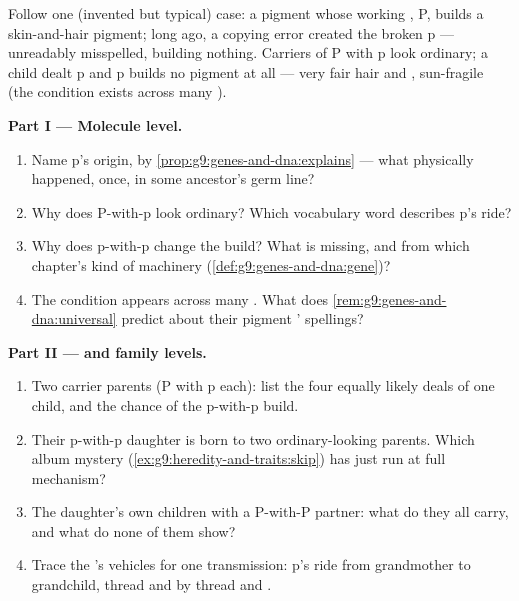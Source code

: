 \begin{problem}\label{pb:g9:genes-and-dna:1}
Follow one (invented but typical) case: a pigment 
whose working , P, builds a skin-and-hair pigment;
long ago, a copying error created the broken  p ---
unreadably misspelled, building nothing. Carriers of P
with p look ordinary; a child dealt p and p builds no
pigment at all --- very fair hair and , sun-fragile
 (the condition exists across many ).

\medskip\noindent\textbf{Part I --- Molecule level.}
\begin{enumerate}
  \item Name p's origin, by
        \cref{prop:g9:genes-and-dna:explains} --- what
        physically happened, once, in some ancestor's
        germ line?
  \item Why does P-with-p look ordinary? Which vocabulary
        word describes p's ride?
  \item Why does p-with-p change the build? What is
        missing, and from which chapter's kind of
        machinery (\cref{def:g9:genes-and-dna:gene})?
  \item The condition appears across many . What
        does \cref{rem:g9:genes-and-dna:universal}
        predict about their pigment ' spellings?
\end{enumerate}

\medskip\noindent\textbf{Part II ---  and
family levels.}
\begin{enumerate}[resume]
  \item Two carrier parents (P with p each): list the
        four equally likely deals of one child, and the
        chance of the p-with-p build.
  \item Their p-with-p daughter is born to two
        ordinary-looking parents. Which album mystery
        (\cref{ex:g9:heredity-and-traits:skip}) has just
        run at full mechanism?
  \item The daughter's own children with a P-with-P
        partner: what do they all carry, and what do
        none of them show?
  \item Trace the 's vehicles for one transmission:
        p's ride from grandmother to grandchild, thread
        and  by thread and .
\end{enumerate}


\end{problem}
